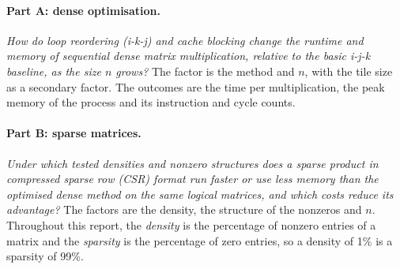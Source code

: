 \documentclass[11pt,a4paper]{article}
\begin{document}
\paragraph{Part A: dense optimisation.} \emph{How do loop reordering (i-k-j) and
cache blocking change the runtime and memory of sequential dense matrix
multiplication, relative to the basic i-j-k baseline, as the size $n$ grows?}
The factor is the method and $n$, with the tile size as a secondary factor. The
outcomes are the time per multiplication, the peak memory of the process and its
instruction and cycle counts.

\paragraph{Part B: sparse matrices.} \emph{Under which tested densities and
nonzero structures does a sparse product in compressed sparse row (CSR) format
run faster or use less memory than the optimised dense method on the same
logical matrices, and which costs reduce its advantage?} The factors are the
density, the structure of the nonzeros and $n$. Throughout this report, the
\emph{density} is the percentage of nonzero entries of a matrix and the
\emph{sparsity} is the percentage of zero entries, so a density of 1\% is a
sparsity of 99\%.
\end{document}
